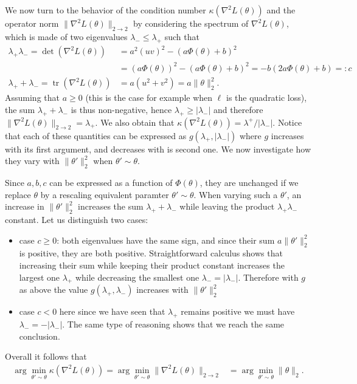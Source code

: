 \documentclass{article}
\theoremstyle{plain}
\theoremstyle{definition}
\theoremstyle{remark}
\def\tr{{\operatorname{tr}}}
\begin{document}
{We now turn to the behavior of the condition number $\kappa(\nabla^{2} L(\theta))$ and the operator norm $\|\nabla^{2} L(\theta)\|_{2 \to 2}$ by considering the spectrum of $\nabla^{2} L(\theta)$, which is made of two eigenvalues $\lambda_{-} \leq \lambda_{+}$ such that 
\begin{align*}
\lambda_{+}\lambda_{-} 
= \det (\nabla^{2} L(\theta)) 
&= a^{2} (uv)^{2}-(a\Phi(\theta)+b)^{2} \\
& = (a\Phi(\theta))^{2}-(a\Phi(\theta)+b)^{2} 
= -b(2 a\Phi(\theta)+b)
=: c\\
\lambda_{+}+\lambda_{-} = \tr ( \nabla^{2} L(\theta)) 
&= a (u^{2}+v^{2}) = a \|\theta\|_{2}^{2}.
\end{align*}
Assuming that $a \geq 0$ (this is the case for example when $\ell$ is the quadratic loss), the sum $\lambda_{+}+\lambda_{-}$ is thus non-negative, hence
$\lambda_{+} \geq |\lambda_{-}|$ and therefore
 $\|\nabla^{2}L(\theta)\|_{2 \to 2} = \lambda_{+}$. We also obtain that $\kappa(\nabla^{2} L(\theta)) = \lambda^{+}/|\lambda_{-}|$. Notice that each of these quantities can be expressed as $g(\lambda_{+},|\lambda_{-}|)$ where $g$ increases with its first argument, and decreases with is second one. We now investigate how they vary with $\|\theta'\|_{2}^{2}$ when $\theta' \sim \theta$.
 
Since $a,b,c$ can be expressed as a function of $\Phi(\theta)$, they are unchanged if we replace $\theta$ by a rescaling equivalent paramter $\theta' \sim \theta$. 
When varying such a $\theta'$, an increase in $\|\theta'\|_{2}^{2}$ increases the sum $\lambda_{+}+\lambda_{-}$ while leaving the product $\lambda_{+}\lambda_{-}$ constant. Let us distinguish two cases:
\begin{itemize}
\item case $c\geq 0$: both eigenvalues have the same sign, and since their sum $a \|\theta'\|_{2}^{2}$ is positive, they are both positive. Straightforward calculus shows that increasing their sum while keeping their product constant increases the largest one $\lambda_{+}$ while decreasing the smallest one $\lambda_{-}=|\lambda_{-}|$. Therefore with $g$ as above the value $g(\lambda_{+},\lambda_{-})$ increases with $\|\theta'\|_{2}^{2}$ 
\item case $c<0$ here since we have seen that $\lambda_{+}$ remains positive we must have $\lambda_{-}= -|\lambda_{-}|$. The same type of reasoning shows that we reach the same conclusion.
\end{itemize}
Overall it follows that
\begin{align}
\arg\min_{\theta' \sim \theta} \kappa(\nabla^2 L(\theta)) 
= \arg\min_{\theta' \sim \theta} \|\nabla^2 L(\theta)\|_{2 \to 2}
&= \arg\min_{\theta' \sim \theta} \|\theta\|_{2}.\label{eq:MinCondOrOpNormIsMinThetaNorm}
\end{align}



}
\end{document}
